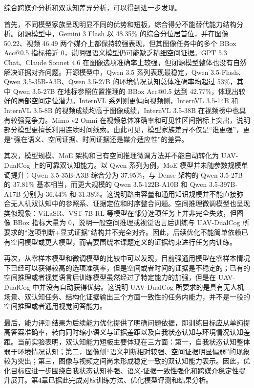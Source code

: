 综合跨媒介分析和双认知差异分析，可以得到进一步发现。

首先，不同模型家族呈现明显不同的优势和短板，综合得分不能替代能力结构分析。闭源模型中，Gemini 3 Flash 以 48.35\% 的综合分位居首位，并在图像 50.22、视频 46.49 两个媒介上都保持较强表现，但其图像任务中的多个 BBox Acc@0.5 指标接近 0，说明强语义模型仍可能缺乏精细空间证据。GPT 5.3 Chat、Claude Sonnet 4.6 在图像选项准确率上较强，但闭源模型整体也没有自然解决证据对齐问题。开源模型中，Qwen 3.5 系列表现最稳定，Qwen 3.5-Flash、Qwen 3.5-35B-A3B、Qwen 3.5-27B 的环境情况认知总体准确率均超过 53\%，其中 Qwen 3.5-27B 在地标参照位置推理的 BBox Acc@0.5 达到 42.77\%，体现出较好的局部空间定位潜力。InternVL 系列则更偏向视频侧，InternVL 3.5-14B 和 InternVL 3.5-8B 的视频成绩均高于图像成绩，InternVL 3.5-38B 在视频榜中也具有较强竞争力。Mimo v2 Omni 在视频总体准确率和可见性区间指标上突出，说明部分模型更擅长利用连续时间线索。由此可见，模型家族差异不仅是“谁更强”，更是“强在语义、空间证据、时间证据还是媒介适应性”的差异。

其次，模型规模、MoE 架构和已有空间推理微调方法并不能自动转化为 UAV-DualCog 上的可靠双认知能力。以 Qwen 系列为例，MoE 模型并未随参数规模单调提升：Qwen 3.5-35B-A3B 综合分为 37.95\%，与 Dense 架构的 Qwen 3.5-27B 的 37.81\% 基本相当，而更大规模的 Qwen 3.5-122B-A10B 和 Qwen 3.5-397B-A17B 分别为 36.44\% 和 31.38\%。这说明路由容量和通用知识规模并不能直接弥合无人机双认知中的参照系、证据定位和时序整合问题。空间推理微调模型也呈现类似现象：ViLaSR、VST-7B-RL 等模型在部分选项任务上并非完全失效，但图像 BBox 指标大量为 0，说明一般空间推理或视觉语言后训练与 UAV-DualCog 所要求的“选项判断+显式证据”结构并不完全对齐。因此，后续优化不能简单依赖已有空间模型或更大模型，而需要围绕本课题定义的证据约束进行任务内训练。

再次，从零样本模型和微调模型的比较中可以发现，目前强通用模型在零样本情况下已经可以获得较高的选项准确率，但是空间或者时间的证据是不稳定的；已有的空间推理或者视觉语言后训练模型虽然经过了特定能力的加强，但是在 UAV-DualCog 中并没有自动获得优势。这说明 UAV-DualCog 所要求的是具有无人机场景、双认知任务、结构化证据输出三个方面一致性的任务内能力，并不是一般的空间推理或者通用视觉问答能力。

最后，能力评测结果为后续能力优化提供了明确问题依据，即训练目标应从单纯提高答案准确率，转向同时缩小语义与证据差距以及自我状态认知与环境情况认知差距。当前实验表明，双认知能力短板主要体现在三方面：第一，自我状态认知整体弱于环境情况认知；第二，图像侧“语义判断相对较强、空间证据明显偏弱”的现象较为突出；第三，图像与视频之间尚未形成稳定一致的双认知能力表示。因此，优化目标应进一步围绕自我状态认知补强、语义-证据一致性强化和跨媒介稳定性提升展开。第4章已据此完成对应训练方法、优化模型评测和结果分析。

